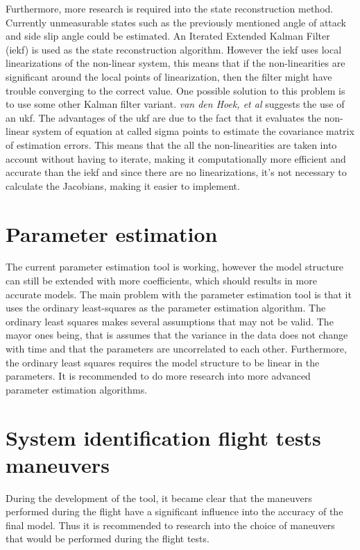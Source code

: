 Furthermore, more research is required into the state reconstruction method. Currently unmeasurable states such as the previously mentioned angle of attack and side slip angle could be estimated. An Iterated Extended Kalman Filter (\gls{iekf}) is used as the state reconstruction algorithm. However the \gls{iekf} uses local linearizations of the non-linear system, this means that if the non-linearities are significant around the local points of linearization, then the filter might have trouble converging to the correct value. One possible solution to this problem is to use some other Kalman filter variant. \textit{van den Hoek, et al} \cite{van_den_hoek} suggests the use of an \gls{ukf}. The advantages of the \gls{ukf} are due to the fact that it evaluates the non-linear system of equation at called sigma points to estimate the covariance matrix of estimation errors. This means that the all the non-linearities are taken into account without having to iterate, making it computationally more efficient and accurate than the \gls{iekf} and since there are no linearizations, it's not necessary to calculate the Jacobians, making it easier to implement.


\section{Parameter estimation}
The current parameter estimation tool is working, however the model structure can still be extended with more coefficients, which should results in more accurate models. The main problem with the parameter estimation tool is that it uses the ordinary least-squares as the parameter estimation algorithm. The ordinary least squares makes several assumptions that may not be valid. The mayor ones being, that is assumes that the variance in the data does not change with time and that the parameters are uncorrelated to each other. Furthermore, the ordinary least squares requires the model structure to be linear in the parameters. It is recommended to do more research into more advanced parameter estimation algorithms.

\section{System identification flight tests maneuvers}
During the development of the tool, it became clear that the maneuvers performed during the flight have a significant influence into the accuracy of the final model. Thus it is recommended to research into the choice of maneuvers that would be performed during the flight tests.

